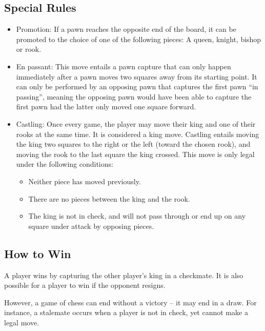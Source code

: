 \documentclass[12pt, a4paper]{article}
\begin{document}
\subsection{Special Rules}
\begin{itemize}
\item Promotion: If a pawn reaches the opposite end of the board, it can be promoted to the choice of one of the following pieces: A queen, knight, bishop or rook.
\item En passant: This move entails a pawn capture that can only happen immediately after a pawn moves two squares away from its starting point. It can only be performed by an opposing pawn that captures the first pawn “in passing”, meaning the opposing pawn would have been able to capture the first pawn had the latter only moved one square forward.
\item Castling: Once every game, the player may move their king and one of their rooks at the same time. It is considered a king move. Castling entails moving the king two squares to the right or the left (toward the chosen rook), and moving the rook to the last square the king crossed. This move is only legal under the following conditions:	
\begin{itemize}
\item Neither piece has moved previously.
\item There are no pieces between the king and the rook.
\item The king is not in check, and will not pass through or end up on any square under attack by opposing pieces.
\end{itemize}
\end{itemize}

\subsection{How to Win}
A player wins by capturing the other player’s king in a checkmate. It is also possible for a player to win if the opponent resigns.

However, a game of chess can end without a victory – it may end in a draw. For instance, a stalemate occurs when a player is not in check, yet cannot make a legal move. 

\newpage
\end{document}
